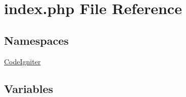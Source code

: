 \hypertarget{index_8php}{}\section{index.\+php File Reference}
\label{index_8php}
\subsection*{Namespaces}
\begin{DoxyCompactItemize}
\item 
 \mbox{\hyperlink{namespace_code_igniter}{Code\+Igniter}}
\end{DoxyCompactItemize}
\subsection*{Variables}
